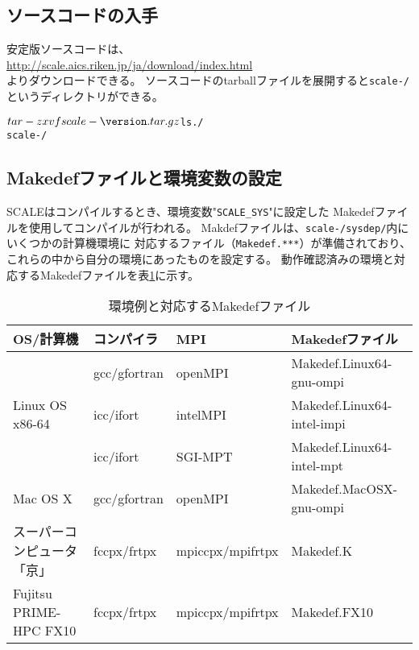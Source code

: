 \subsection{ソースコードの入手} \label{subsec:get_source_code}
安定版ソースコードは、\\
 \url{http://scale.aics.riken.jp/ja/download/index.html}\\
よりダウンロードできる。
ソースコードのtarballファイルを展開すると\texttt{scale-{\version}/}というディレクトリができる。
\begin{alltt}
 $ tar -zxvf scale-{\version}.tar.gz
 $ ls ./
   scale-{\version}/
\end{alltt}

\subsection{Makedefファイルと環境変数の設定} \label{subsec:set_evniromnet}

SCALEはコンパイルするとき、環境変数"\verb|SCALE_SYS|"に設定した
Makedefファイルを使用してコンパイルが行われる。
Makdefファイルは、\texttt{scale-{\version}/sysdep/}内にいくつかの計算機環境に
対応するファイル（\texttt{Makedef.***}）が準備されており、
これらの中から自分の環境にあったものを設定する。
動作確認済みの環境と対応するMakedefファイルを表\ref{tab:makedef}に示す。

\begin{table}[htb]
\begin{center}
\caption{環境例と対応するMakedefファイル}
\begin{tabularx}{150mm}{|l|l|X|l|} \hline
 \rowcolor[gray]{0.9} OS/計算機 & コンパイラ & MPI & Makedefファイル \\ \hline
              & gcc/gfortran & openMPI & Makedef.Linux64-gnu-ompi \\ \cline{2-4}
 Linux OS x86-64 & icc/ifort & intelMPI & Makedef.Linux64-intel-impi \\ \cline{2-4}
              & icc/ifort    & SGI-MPT & Makedef.Linux64-intel-mpt \\ \hline
 Mac OS X     & gcc/gfortran & openMPI & Makedef.MacOSX-gnu-ompi \\ \hline
 スーパーコンピュータ「京」 & fccpx/frtpx & mpiccpx/mpifrtpx & Makedef.K \\ \hline
 Fujitsu PRIME-HPC FX10   & fccpx/frtpx & mpiccpx/mpifrtpx & Makedef.FX10 \\ \hline
\end{tabularx}
\label{tab:makedef}
\end{center}
\end{table}



